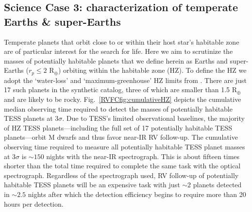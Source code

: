 \subsection{Science Case 3: characterization of temperate Earths \& super-Earths}
Temperate planets that orbit close to or within their host star's habitable zone are of particular
interest for the search for life.
Here we aim to scrutinize the masses of potentially habitable planets that we define herein as
Earths and super-Earths ($r_p \leq 2$ R$_{\oplus}$) orbiting within the habitable zone (HZ). To define
the HZ we adopt
the `water-loss' and `maximum-greenhouse' HZ limits from \cite{kopparapu13}. There are just 17 such
planets in the  synthetic catalog, three of which are smaller than 1.5
R$_{\oplus}$ and are likely to be rocky. 
Fig.~\ref{RVFCfig:cumulativeHZ} depicts the cumulative median observing time required to detect the masses
of potentially habitable TESS planets at $3\sigma$.
Due to TESS's limited observational baselines, the majority of HZ TESS
planets---including the full set of 17 potentially habitable TESS planets---orbit M dwarfs and thus
favor near-IR RV follow-up. The cumulative observing time required to measure all potentially
habitable TESS planet masses at $3\sigma$ is $\sim 150$ nights with
the near-IR spectrograph. This is about fifteen times shorter than the total time required
to complete the same task with the optical spectrograph. Regardless of the spectrograph
used, RV follow-up of potentially habitable TESS planets will be an expensive task with
just $\sim 2$ planets detected in $\sim 2.5$ nights after which the detection
efficiency begins to require more than 20 hours per detection. \\

